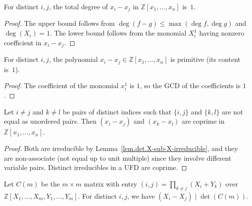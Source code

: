 \begin{lemma}
\label{lem.det.X-sub-X-totalDegree}
\leanhelper
\leanok
For distinct $i, j$, the total degree of $x_i - x_j$ in
$\mathbb{Z}[x_1, \ldots, x_n]$ is~$1$.
\end{lemma}

\begin{proof}
\leanok
The upper bound follows from $\deg(f - g) \leq \max(\deg f, \deg g)$
and $\deg(X_i) = 1$. The lower bound follows from the monomial
$X_i^1$ having nonzero coefficient in $x_i - x_j$.
\end{proof}

\begin{lemma}
\label{lem.det.X-sub-X-isPrimitive}
\leanhelper
\leanok
For distinct $i, j$, the polynomial $x_i - x_j \in \mathbb{Z}[x_1, \ldots, x_n]$
is primitive (its content is~$1$).
\end{lemma}

\begin{proof}
\leanok
The coefficient of the monomial $x_i^1$ is $1$, so the GCD of the
coefficients is $1$.
\end{proof}

\begin{lemma}
\label{lem.det.X-sub-X-isRelPrime}
\leanhelper
\leanok
Let $i \neq j$ and $k \neq l$ be pairs of distinct indices such that
$\{i,j\}$ and $\{k,l\}$ are not equal as unordered pairs. Then
$(x_i - x_j)$ and $(x_k - x_l)$ are coprime in
$\mathbb{Z}[x_1, \ldots, x_n]$.
\end{lemma}

\begin{proof}
\leanok
Both are irreducible by Lemma~\ref{lem.det.X-sub-X-irreducible}, and they
are non-associate (not equal up to unit multiple) since they involve
different variable pairs. Distinct irreducibles in a UFD are coprime.
\end{proof}

\begin{lemma}
\label{lem.det.cauchy-poly-dvd-x}
\leanhelper
\leanok
Let $C(m)$ be the $m \times m$ matrix with entry
$(i,j) = \prod_{k \neq j}(X_i + Y_k)$ over
$\mathbb{Z}[X_1, \ldots, X_m, Y_1, \ldots, Y_m]$.
For distinct $i, j$, we have $(X_i - X_j) \mid \det(C(m))$.
\end{lemma}

